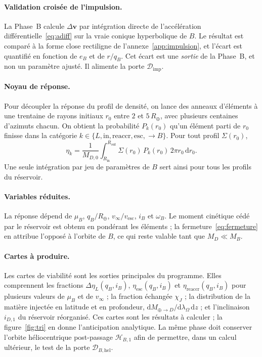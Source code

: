 \documentclass[11pt,a4paper,openany]{report}
\newcommand{\Rt}{R_{\oplus}}
\newcommand{\dd}{\mathrm{d}}
\begin{document}
\paragraph{Validation croisée de l'impulsion.}
La Phase~B calcule $\Delta\mathbf{v}$ par intégration directe de l'accélération
différentielle~\eqref{eq:adiff} sur la vraie conique hyperbolique de $B$. Le résultat est comparé à
la forme close rectiligne de l'annexe~\ref{app:impulsion}, et l'écart est quantifié en fonction de
$e_B$ et de $r/q_B$. Cet écart est une \emph{sortie} de la Phase~B, et non un paramètre ajusté. Il
alimente la porte $\mathcal{D}_{\mathrm{imp}}$.

\paragraph{Noyau de réponse.}
Pour découpler la réponse du profil de densité, on lance des anneaux d'éléments à une trentaine
de rayons initiaux $r_0$ entre $2$ et $5\,\Rt$, avec plusieurs centaines d'azimuts chacun. On obtient
la probabilité $P_k(r_0)$ qu'un élément parti de $r_0$ finisse dans la catégorie
$k\in\{L,\mathrm{in},\mathrm{reaccr},\mathrm{esc},\to B\}$. Pour tout profil $\Sigma(r_0)$,
\begin{equation}
\eta_k=\frac{1}{M_{D,0}}\int_{R_{\mathrm{in}}}^{R_{\mathrm{out}}}\Sigma(r_0)\,P_k(r_0)\,2\pi r_0\,\dd r_0.
\label{eq:noyau}
\end{equation}
Une seule intégration par jeu de paramètres de $B$ sert ainsi pour tous les profils du réservoir.

\paragraph{Variables réduites.}
La réponse dépend de $\mu_B$, $q_B/\Rt$, $v_\infty/v_{\mathrm{esc}}$, $i_B$ et $\omega_B$. Le moment
cinétique cédé par le réservoir est obtenu en pondérant les éléments ; la
fermeture~\eqref{eq:fermeture} en attribue l'opposé à l'orbite de $B$, ce qui reste valable tant que
$M_D\ll M_B$.

\paragraph{Cartes à produire.}
Les cartes de viabilité sont les sorties principales du programme. Elles comprennent les
fractions $\Delta\eta_L(q_B,i_B)$, $\eta_{\mathrm{esc}}(q_B,i_B)$ et $\eta_{\mathrm{reaccr}}(q_B,i_B)$ pour
plusieurs valeurs de $\mu_B$ et de $v_\infty$ ; la fraction échangée $\chi_J$ ; la distribution
de la matière injectée en latitude et en profondeur, $\dd M_{\oplus\to D}/\dd\lambda_\Omega\,\dd z$ ; et l'inclinaison $i_{D,1}$ du
réservoir réorganisé. Ces cartes sont les résultats à calculer ; la figure~\ref{fig:tri} en donne
l'anticipation analytique.
La même phase doit conserver l'orbite héliocentrique post-passage $\mathcal{H}_{B,1}$ afin de
permettre, dans un calcul ultérieur, le test de la porte $\mathcal{D}_{B,\mathrm{hel}}$.
\end{document}
